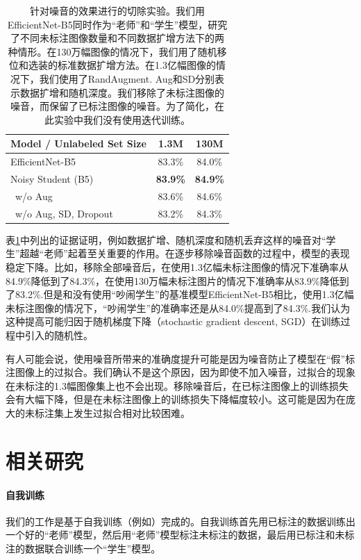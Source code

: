 \documentclass[10pt]{article}
\begin{document}
\begin{table}[h!]
	\small
	\centering                                                                 
	\begin{tabular}{l|cc}                                                
		\toprule 
		Model / Unlabeled Set Size &    1.3M & 130M  \\
		\midrule      
		EfficientNet-B5  & 83.3\% & 84.0\% \\
		\midrule
		Noisy Student (B5) & \bf 83.9\% & \bf 84.9\% \\
		\  w/o Aug & 83.6\% & 84.6\% \\
		\  w/o Aug, SD, Dropout & 83.2\% & 84.3\% \\
		\bottomrule
	\end{tabular}
	\caption{针对噪音的效果进行的切除实验。我们用EfficientNet-B5同时作为“老师”和“学生”模型，研究了不同未标注图像数量和不同数据扩增方法下的两种情形。在130万幅图像的情况下，我们用了随机移位和选装的标准数据扩增方法。在1.3亿幅图像的情况下，我们使用了RandAugment. Aug和SD分别表示数据扩增和随机深度。我们移除了未标注图像的噪音，而保留了已标注图像的噪音。为了简化，在此实验中我们没有使用迭代训练。}
	\label{tab:abl_noise}
\end{table}

表\ref{tab:abl_noise}中列出的证据证明，例如数据扩增、随机深度和随机丢弃这样的噪音对“学生”超越“老师”起着至关重要的作用。在逐步移除噪音函数的过程中，模型的表现稳定下降。比如，移除全部噪音后，在使用1.3亿幅未标注图像的情况下准确率从84.9\%降低到了84.3\%，在使用130万幅未标注图片的情况下准确率从83.9\%降低到了83.2\%.但是和没有使用“吵闹学生”的基准模型EfficientNet-B5相比，使用1.3亿幅未标注图像的情况下，“吵闹学生”的准确率还是从84.0\%提高到了84.3\%.我们认为这种提高可能归因于随机梯度下降（stochastic gradient descent, SGD）在训练过程中引入的随机性。  


有人可能会说，使用噪音所带来的准确度提升可能是因为噪音防止了模型在“假”标注图像上的过拟合。我们确认不是这个原因，因为即使不加入噪音，过拟合的现象在未标注的1.3幅图像集上也不会出现。移除噪音后，在已标注图像上的训练损失会有大幅下降，但是在未标注图像上的训练损失下降幅度较小。这可能是因为在庞大的未标注集上发生过拟合相对比较困难。

\section{相关研究}
\paragraph{自我训练}
我们的工作是基于自我训练（例如\cite{scudder1965probability,yarowsky1995unsupervised,riloff2003learning}）完成的。自我训练首先用已标注的数据训练出一个好的“老师”模型，然后用“老师”模型标注未标注的数据，最后用已标注和未标注的数据联合训练一个“学生”模型。  
\end{document}
